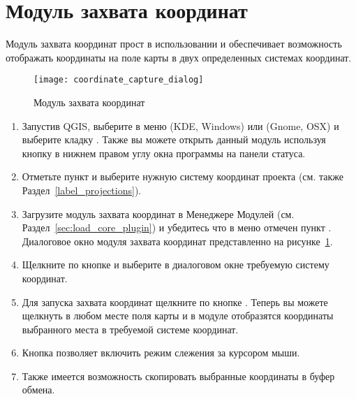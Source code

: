 
\section{Модуль захвата координат}


Модуль захвата координат прост в использовании и обеспечивает возможность
отображать координаты на поле карты в двух определенных системах координат.

\begin{figure}[ht]
   \centering
   \texttt{[image: coordinate\_capture\_dialog]}
   \caption{Модуль захвата координат \nixcaption}\label{fig:coordinate_capture_dialog}
\end{figure}

\begin{enumerate}
  \item Запустив QGIS, выберите  в меню
   (KDE, Windows) или  (Gnome, OSX)
  и выберите кладку . Также вы можете открыть данный модуль
  используя кнопку 
  в нижнем правом углу окна программы на панели статуса.
  \item Отметьте пункт 
  и выберите нужную систему координат проекта (см. также Раздел~\ref{label_projections}).
  \item Загрузите модуль захвата координат в Менеджере Модулей (см. Раздел~\ref{sec:load_core_plugin})
  и убедитесь что в меню  \arrow {}
  отмечен пункт .
  Диалоговое окно модуля захвата координат представленно на
  рисунке~\ref{fig:coordinate_capture_dialog}.
  \item Щелкните по кнопке  и выберите в диалоговом окне
  требуемую систему координат.
  \item Для запуска захвата координат щелкните по кнопке .
  Теперь вы можете щелкнуть в любом месте поля карты и в модуле отобразятся
  координаты выбранного места в требуемой системе координат.
  \item Кнопка  позволяет включить
  режим слежения за курсором мыши.
  \item Также имеется возможность скопировать выбранные координаты в буфер обмена.
\end{enumerate}

\FloatBarrier
